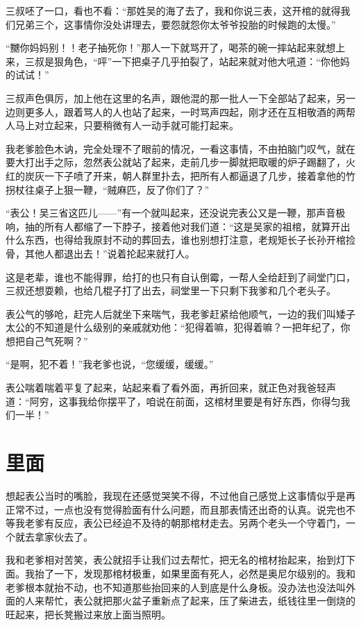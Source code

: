三叔呸了一口，看也不看：“那姓吴的海了去了，我和你说三表，这开棺的就得我们兄弟三个，这事情你没处讲理去，要怨就怨你太爷爷投胎的时候跑的太慢。”

“嬲你妈妈别！！老子抽死你！”那人一下就骂开了，喝茶的碗一摔站起来就想上来，三叔是狠角色，“呯”一下把桌子几乎拍裂了，站起来就对他大吼道：“你他妈的试试！”

三叔声色俱厉，加上他在这里的名声，跟他混的那一批人一下全部站了起来，另一边则更多人，跟着骂人的人也站了起来，一时骂声四起，刚才还在互相敬酒的两帮人马上对立起来，只要稍微有人一动手就可能打起来。

我老爹脸色木讷，完全处理不了眼前的情况，一看这事情，不由拍脑门叹气，就在要大打出手之际，忽然表公就站了起来，走前几步一脚就把取暖的炉子踢翻了，火红的炭灰一下子喷了开来，朝人群里扑去，把所有人都逼退了几步，接着拿他的竹拐杖往桌子上狠一鞭，“贼麻匹，反了你们了？”

“表公！吴三省这匹儿——”有一个就叫起来，还没说完表公又是一鞭，那声音极响，抽的所有人都缩了一下脖子，接着他对我们道：“这是吴家的祖棺，就算开出什么东西，也得给我原封不动的葬回去，谁也别想打注意，老规矩长子长孙开棺捡骨，其他人都退出去！”说着抡起来就打人。

这是老辈，谁也不能得罪，给打的也只有自认倒霉，一帮人全给赶到了祠堂门口，三叔还想耍赖，也给几棍子打了出去，祠堂里一下只剩下我爹和几个老头子。

表公气的够呛，赶完人后就坐下来喘气，我老爹赶紧给他顺气，一边的我们叫矮子太公的不知道是什么级别的亲戚就劝他：“犯得着嘛，犯得着嘛？一把年纪了，你想把自己气死啊？”

“是啊，犯不着！”我老爹也说，“您缓缓，缓缓。”

表公喘着喘着平复了起来，站起来看了看外面，再折回来，就正色对我爸轻声道：“阿穷，这事我给你摆平了，咱说在前面，这棺材里要是有好东西，你得匀我们一半！”

\chapter{里面}

想起表公当时的嘴脸，我现在还感觉哭笑不得，不过他自己感觉上这事情似乎是再正常不过，一点也没有觉得脸面有什么问题，而且那表情还出奇的认真。说完也不等我老爹有反应，表公已经迫不及待的朝那棺材走去。另两个老头一个守着门，一个就去拿家伙去了。

我和老爹相对苦笑，表公就招手让我们过去帮忙，把无名的棺材抬起来，抬到灯下面。我抬了一下，发现那棺材极重，如果里面有死人，必然是奥尼尔级别的。我和老爹根本就抬不动，也不知道那些抬回来的人到底是什么身板。没办法也没法叫外面的人来帮忙，表公就把那火盆子重新点了起来，压了柴进去，纸钱往里一倒烧的旺起来，把长凳搬过来放上面当照明。

